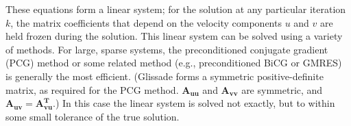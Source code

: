 \noindent
These equations form a linear system; for the solution at any particular iteration $k$, 
the matrix coefficients that depend on the velocity components $u$ and $v$ are held frozen during the solution.
This linear system can be solved using a variety of methods. For large, sparse systems, the preconditioned conjugate gradient (PCG) method 
or some related method (e.g., preconditioned BiCG or GMRES) is generally the most efficient. 
(Glissade forms a symmetric positive-definite matrix, as required for the PCG method.
$\mathbf{A_{uu}}$ and $\mathbf{A_{vv}}$ are symmetric, and $\mathbf{A_{uv}} = \mathbf{A_{vu}^T}$.) 
In this case the linear system is solved not exactly, but to within some small tolerance of the true solution.


